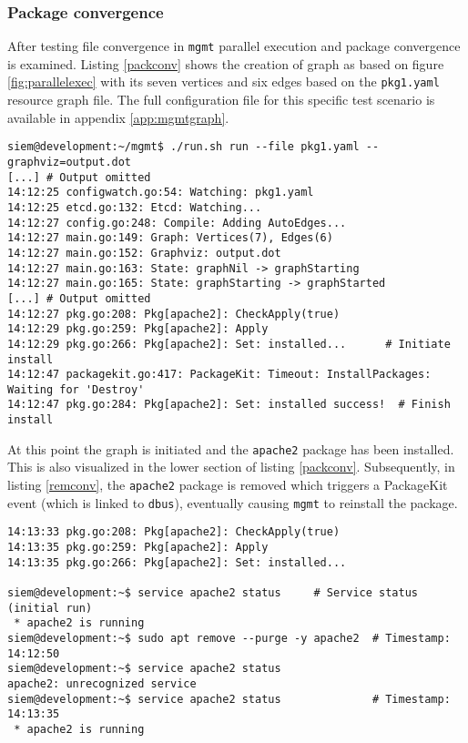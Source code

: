\subsubsection{Package convergence}
After testing file convergence in \texttt{mgmt} parallel execution and package convergence is examined. Listing \ref{packconv} shows the creation of graph as based on figure \ref{fig:parallelexec} with its seven vertices and six edges based on the \texttt{pkg1.yaml} resource graph file. The full configuration file for this specific test scenario is available in appendix \ref{app:mgmtgraph}.
\\
\begin{lstlisting}[caption={Graph initiation for package convergence},label=packconv]
siem@development:~/mgmt$ ./run.sh run --file pkg1.yaml --graphviz=output.dot
[...] # Output omitted
14:12:25 configwatch.go:54: Watching: pkg1.yaml
14:12:25 etcd.go:132: Etcd: Watching...
14:12:27 config.go:248: Compile: Adding AutoEdges...
14:12:27 main.go:149: Graph: Vertices(7), Edges(6)
14:12:27 main.go:152: Graphviz: output.dot
14:12:27 main.go:163: State: graphNil -> graphStarting
14:12:27 main.go:165: State: graphStarting -> graphStarted
[...] # Output omitted
14:12:27 pkg.go:208: Pkg[apache2]: CheckApply(true)
14:12:29 pkg.go:259: Pkg[apache2]: Apply
14:12:29 pkg.go:266: Pkg[apache2]: Set: installed...      # Initiate install
14:12:47 packagekit.go:417: PackageKit: Timeout: InstallPackages: Waiting for 'Destroy'
14:12:47 pkg.go:284: Pkg[apache2]: Set: installed success!  # Finish install
\end{lstlisting}
\noindent
At this point the graph is initiated and the \texttt{apache2} package has been installed. This is also visualized in the lower section of listing \ref{packconv}. Subsequently, in listing \ref{remconv}, the \texttt{apache2} package is removed which triggers a PackageKit event (which is linked to \texttt{dbus}), eventually causing \texttt{mgmt} to reinstall the package. 
\\
\begin{lstlisting}[caption={PackageKit convergence in \texttt{mgmt}},label=remconv]
14:13:33 pkg.go:208: Pkg[apache2]: CheckApply(true)
14:13:35 pkg.go:259: Pkg[apache2]: Apply
14:13:35 pkg.go:266: Pkg[apache2]: Set: installed...

siem@development:~$ service apache2 status     # Service status (initial run)
 * apache2 is running
siem@development:~$ sudo apt remove --purge -y apache2  # Timestamp: 14:12:50
siem@development:~$ service apache2 status
apache2: unrecognized service
siem@development:~$ service apache2 status              # Timestamp: 14:13:35
 * apache2 is running
\end{lstlisting}

